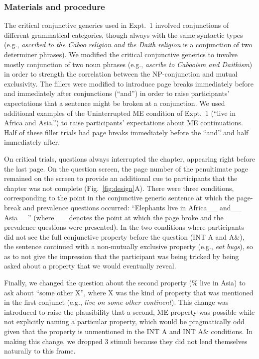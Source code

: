 \documentclass[10pt,letterpaper]{article}
\begin{document}
\subsubsection{Materials and procedure}

The critical conjunctive generics used in Expt.~1 involved conjunctions of different grammatical categories, though always with the same syntactic types (e.g., \emph{ascribed to the Caboo religion and the Daith religion} is a conjunction of two determiner phrases). 
We modified the critical conjunctive generics to involve mostly conjunction of two noun phrases (e.g., \emph{ascribe to Cabooism and Daithism}) in order to strength the correlation between the NP-conjunction and mutual exclusivity. 
The fillers were modified to introduce page breaks immediately before and immediately after conjunctions (``and'') in order to raise participants' expectations that a sentence might be broken at a conjunction.
We used additional examples of the Uninterrupted ME condition of Expt.~1 (``live in Africa and Asia.'') to raise participants' expectations about ME continuations.
Half of these filler trials had page breaks immediately before the ``and'' and half immediately after.

On critical trials, questions always interrupted the chapter, appearing right before the last page.
On the question screen, the page number of the penultimate page remained on the screen to provide an additional cue to participants that the chapter was not complete (Fig.~\ref{fig:design}A).
There were three conditions, corresponding to the point in the conjunctive generic sentence at which the page-break and prevalence questions occurred: ``Elephants live in Africa\_\_ and\_\_ Asia\_\_'' (where \_\_ denotes the point at which the page broke and the prevalence questions were presented).
In the two conditions where participants did not see the full conjunctive property before the question (INT A and A\&), the sentence continued with a non-mutually exclusive property (e.g., \emph{eat bugs}), so as to not give the impression that the participant was being tricked by being asked about a property that we would eventually reveal. 

Finally, we changed the question about the second property (\% live in Asia) to ask about ``some other X'', where X was the kind of property that was mentioned in the first conjunct (e.g., \emph{live on some other continent}).
This change was introduced to raise the plausibility that a second, ME property was possible while not explicitly naming a particular property, which would be pragmatically odd given that the property is unmentioned in the INT A and INT A\& conditions. 
In making this change, we dropped 3 stimuli because they did not lend themselves naturally to this frame.
\end{document}

